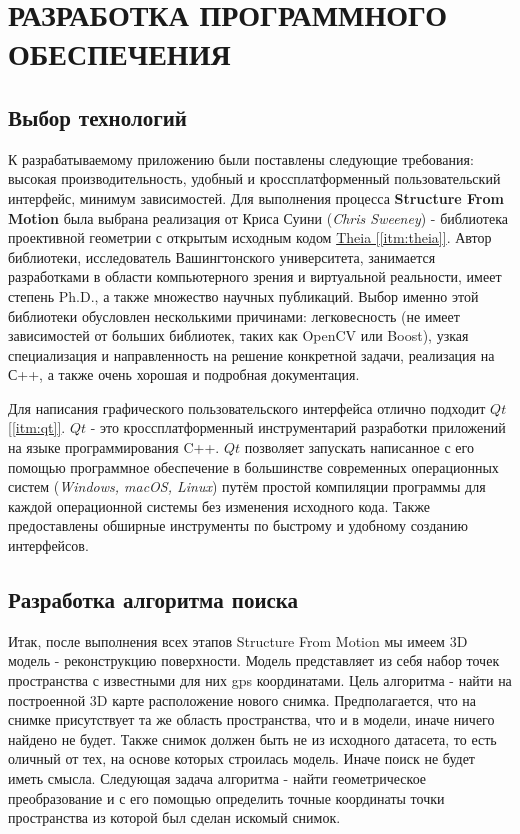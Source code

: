 \chapter{РАЗРАБОТКА ПРОГРАММНОГО ОБЕСПЕЧЕНИЯ}

\section{Выбор технологий}

К разрабатываемому приложению были поставлены следующие требования: высокая производительность, удобный и кроссплатформенный пользовательский интерфейс, минимум зависимостей. Для выполнения процесса \textbf{Structure From Motion} была выбрана реализация от Криса Суини (\textit{Chris Sweeney}) - библиотека проективной геометрии с открытым исходным кодом \hyperref[itm:theia]{Theia [\ref{itm:theia}]}. Автор библиотеки, исследователь Вашингтонского университета, занимается разработками в области компьютерного зрения и виртуальной реальности, имеет степень Ph.D., а также множество научных публикаций. Выбор именно этой библиотеки обусловлен несколькими причинами: легковесность (не имеет зависимостей от больших библиотек, таких как OpenCV или Boost), узкая специализация и направленность на решение конкретной задачи, реализация на С++, а также очень хорошая и подробная документация.

Для написания графического пользовательского интерфейса отлично подходит \hyperref[itm:qt]{$Qt$ [\ref{itm:qt}]}. $Qt$ - это кроссплатформенный инструментарий разработки приложений на языке программирования C++. $Qt$ позволяет запускать написанное с его помощью программное обеспечение в большинстве современных операционных систем (\textit{Windows, macOS, Linux}) путём простой компиляции программы для каждой операционной системы без изменения исходного кода. Также предоставлены обширные инструменты по быстрому и удобному созданию интерфейсов.

\section{Разработка алгоритма поиска}
Итак, после выполнения всех этапов Structure From Motion мы имеем 3D модель - реконструкцию поверхности. Модель представляет из себя набор точек пространства с известными для них gps координатами. Цель алгоритма - найти на построенной 3D карте расположение нового снимка. Предполагается, что на снимке присутствует та же область пространства, что и в модели, иначе ничего найдено не будет. Также снимок должен быть не из исходного датасета, то есть оличный от тех, на основе которых строилась модель. Иначе поиск не будет иметь смысла. Следующая задача алгоритма - найти геометрическое преобразование и с его помощью определить точные координаты точки пространства из которой был сделан искомый снимок.

